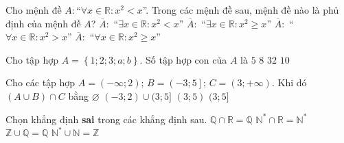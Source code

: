 \begin{ex}%
Cho mệnh đề $A \colon$``$\forall x\in\mathbb{R}:x^2<x$''. Trong các mệnh đề sau, mệnh đề nào là phủ định của mệnh đề $A$?
\choice
{$\overline{A} :$ ``$\exists x\in\mathbb{R}:x^2<x $''}
{\True $\overline{A} :$ ``$\exists x\in\mathbb{R}:x^2\geq x$''}
{$\overline{A} :$ ``$ \forall x\in\mathbb{R}:x^2>x$''}
{$\overline{A} :$ ``$\forall x\in\mathbb{R}:x^2\geq x$''}
\end{ex}

\begin{ex}%
Cho tập hợp $A=\left\{ 1;2;3;a;b \right\}$. Số tập hợp con của $A$ là
\choice
{$5$}
{$8$}
{\True$32$}
{$10$}
\end{ex}

\begin{ex}%
Cho các tập hợp $A=\left(-\infty;2\right)$; $B=\left(-3;5\right]$; $C=\left(3;+\infty \right)$. Khi đó $\left(A\cup B\right)\cap C$ bằng
\choice
{$\varnothing$}
{$(-3;2) \cup (3;5]$}
{$(3;5)$}
{\True $(3;5]$}
\loigiai{
$A\cup B=\left(-\infty;2\right) \cup \left(-3;5\right] = \left(-\infty;5\right] \Rightarrow \left(A\cup B\right)\cap C=\left(-\infty;5\right] \cap \left(3;+\infty \right) = (3;5]. $
}
\end{ex}

\begin{ex}%
Chọn khẳng định \textbf{sai} trong các khẳng định sau.
\choice
{$\mathbb{Q} \cap \mathbb{R} = \mathbb{Q} $}
{$\mathbb{N^{*}} \cap \mathbb{R}=\mathbb{N^{*}} $}
{ $\mathbb{Z} \cup \mathbb{Q}= \mathbb{Q} $}
{\True $\mathbb{N^{*}} \cup \mathbb{N} =\mathbb{Z}$}
\end{ex}

